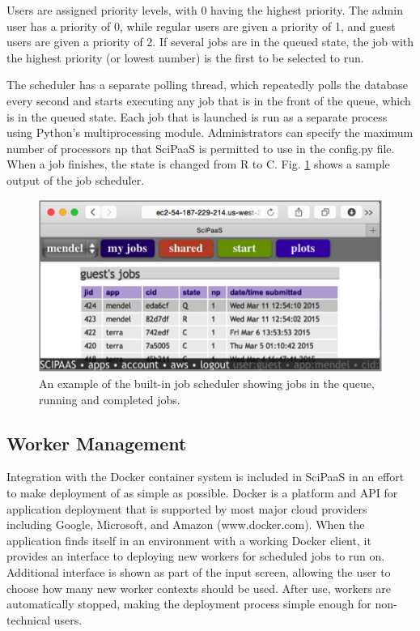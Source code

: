 \documentclass[10pt,reprint]{socc14}
\begin{document}
Users are assigned priority levels, with 0 having the highest priority.  The admin user has a priority of 0, while regular users are given a priority of 1, and guest users are given a priority of 2. If several jobs are in the queued state, the job with the highest priority (or lowest number) is the first to be selected to run.

The scheduler has a separate polling thread, which repeatedly polls the database every second and starts executing any job that is in the front of the queue, which is in the queued state.  Each job that is launched is run as a separate process using Python’s multiprocessing module.  Administrators can specify the maximum number of processors np that SciPaaS is permitted to use in the config.py file.  When a job finishes, the state is changed from R to C. Fig. \ref{sched} shows a sample output of the job scheduler.

\begin{figure}[t]
\centering
\includegraphics[natwidth=454,natheight=228]{figs/sched.png}
\caption{An example of the built-in job scheduler showing jobs in the queue, running and completed jobs. \label{sched}}
\end{figure}

\subsection{Worker Management}

Integration with the Docker container system is included in SciPaaS in an effort to make deployment of as simple as possible. Docker is a platform and API for application deployment that is supported by most major cloud providers including Google, Microsoft, and Amazon (www.docker.com). When the application finds itself in an environment with a working Docker client, it provides an interface to deploying new workers for scheduled jobs to run on. Additional interface is shown as part of the input screen, allowing the user to choose how many new worker contexts should be used. After use, workers are automatically stopped, making the deployment process simple enough for non-technical users.
\end{document}
